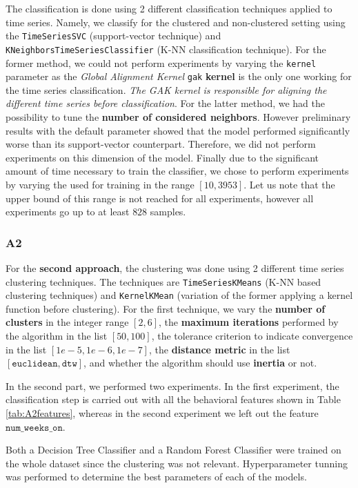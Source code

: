 \documentclass[sigplan,screen]{acmart}
\begin{document}
The classification is done using 2 different classification techniques applied to time series. Namely, we classify for the clustered and non-clustered setting using the \texttt{TimeSeriesSVC} (support-vector technique) and \\ \texttt{KNeighborsTimeSeriesClassifier} (K-NN classification technique). For the former method, we could not perform experiments by varying the \texttt{kernel} parameter as the \textit{Global Alignment Kernel} \texttt{gak} \textbf{kernel} is the only one working for the time series classification. \textit{The GAK kernel is responsible for aligning the different time series before classification}. For the latter method, we had the possibility to tune the \textbf{number of considered neighbors}. However preliminary results with the default parameter showed that the model performed significantly worse than its support-vector counterpart. Therefore, we did not perform experiments on this dimension of the model. Finally due to the significant amount of time necessary to train the classifier, we chose to perform experiments by varying the \textbf{} used for training in the range $[10, 3953]$. Let us note that the upper bound of this range is not reached for all experiments, however all experiments go up to at least $828$ samples.

\subsubsection{A2}
For the \textbf{second approach}, the clustering was done using 2 different time series clustering techniques. The techniques are \texttt{TimeSeriesKMeans} (K-NN based clustering techniques) and \texttt{KernelKMean} (variation of the former applying a kernel function before clustering). For the first technique, we vary the \textbf{number of clusters} in the integer range $[2, 6]$, the \textbf{maximum iterations} performed by the algorithm in the list $[50, 100]$, the tolerance criterion to indicate convergence in the list $[1e-5, 1e-6, 1e-7]$, the \textbf{distance metric} in the list $[\texttt{euclidean}, \texttt{dtw}]$, and whether the algorithm should use \textbf{inertia} or not.

In the second part, we performed two experiments. In the first experiment, the classification step is carried out with all the behavioral features shown in Table \ref{tab:A2features}, whereas in the second experiment we left out the feature $\texttt{num\_weeks\_on}$.

Both a Decision Tree Classifier and a Random Forest Classifier were trained on the whole dataset since the clustering was not relevant. Hyperparameter tunning was performed to determine the best parameters of each of the models.
\end{document}
